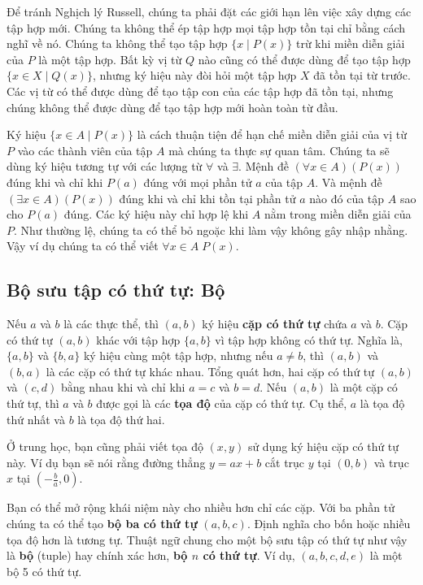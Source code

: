 Để tránh Nghịch lý Russell, chúng ta phải đặt các giới hạn lên việc xây dựng các tập hợp mới. Chúng ta không thể ép tập hợp mọi tập hợp tồn tại chỉ bằng cách nghĩ về nó. Chúng ta không thể tạo tập hợp $\{x \mid P(x)\}$ trừ khi miền diễn giải của $P$ là một tập hợp. Bất kỳ vị từ $Q$ nào cũng có thể được dùng để tạo tập hợp $\{x \in X \mid Q(x)\}$, nhưng ký hiệu này đòi hỏi một tập hợp $X$ đã tồn tại từ trước. Các vị từ có thể được dùng để tạo tập con của các tập hợp đã tồn tại, nhưng chúng không thể được dùng để tạo tập hợp mới hoàn toàn từ đầu.

Ký hiệu $\{x \in A \mid P(x)\}$ là cách thuận tiện để hạn chế miền diễn giải của vị từ $P$ vào các thành viên của tập $A$ mà chúng ta thực sự quan tâm. Chúng ta sẽ dùng ký hiệu tương tự với các lượng từ $\forall$ và $\exists$. Mệnh đề $(\forall x \in A)(P(x))$ đúng khi và chỉ khi $P(a)$ đúng với mọi phần tử $a$ của tập $A$. Và mệnh đề $(\exists x \in A)(P(x))$ đúng khi và chỉ khi tồn tại phần tử $a$ nào đó của tập $A$ sao cho $P(a)$ đúng. Các ký hiệu này chỉ hợp lệ khi $A$ nằm trong miền diễn giải của $P$. Như thường lệ, chúng ta có thể bỏ ngoặc khi làm vậy không gây nhập nhằng. Vậy ví dụ chúng ta có thể viết $\forall x \in A\; P(x)$.

\subsection{Bộ sưu tập có thứ tự: Bộ}

Nếu $a$ và $b$ là các thực thể, thì $(a, b)$ ký hiệu \textbf{cặp có thứ tự} chứa $a$ và $b$. Cặp có thứ tự $(a, b)$ khác với tập hợp $\{a, b\}$ vì tập hợp không có thứ tự. Nghĩa là, $\{a, b\}$ và $\{b, a\}$ ký hiệu cùng một tập hợp, nhưng nếu $a \neq b$, thì $(a, b)$ và $(b, a)$ là các cặp có thứ tự khác nhau. Tổng quát hơn, hai cặp có thứ tự $(a, b)$ và $(c, d)$ bằng nhau khi và chỉ khi $a = c$ và $b = d$. Nếu $(a, b)$ là một cặp có thứ tự, thì $a$ và $b$ được gọi là các \textbf{tọa độ} của cặp có thứ tự. Cụ thể, $a$ là tọa độ thứ nhất và $b$ là tọa độ thứ hai.

\begin{notebox}
Ở trung học, bạn cũng phải viết tọa độ $(x,y)$ sử dụng ký hiệu cặp có thứ tự này. Ví dụ bạn sẽ nói rằng đường thẳng $y = ax + b$ cắt trục $y$ tại $(0, b)$ và trục $x$ tại $(-\frac{b}{a}, 0)$.
\end{notebox}

Bạn có thể mở rộng khái niệm này cho nhiều hơn chỉ các cặp. Với ba phần tử chúng ta có thể tạo \textbf{bộ ba có thứ tự} $(a, b, c)$. Định nghĩa cho bốn hoặc nhiều tọa độ hơn là tương tự. Thuật ngữ chung cho một bộ sưu tập có thứ tự như vậy là \textbf{bộ} (tuple) hay chính xác hơn, \textbf{bộ $n$ có thứ tự}. Ví dụ, $(a, b, c, d, e)$ là một bộ 5 có thứ tự.

